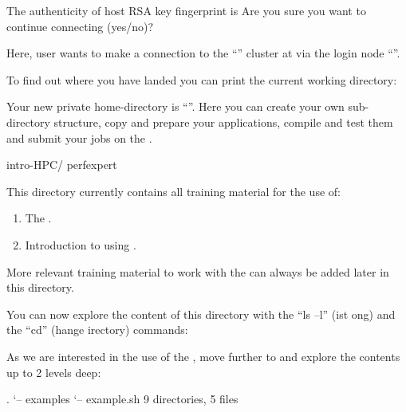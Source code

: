 \begin{prompt}
The authenticity of host %
RSA key fingerprint is %
Are you sure you want to continue connecting (yes/no)? %
\end{prompt}

Here, user \userid wants to make a connection to the ``\hpcname'' cluster at
\university via the login node ``\loginnode''.

\fi
{}
To find out where you have landed you can print the current working directory:
\begin{prompt}
\end{prompt}


Your new private home-directory is ``\homedir''.
Here you can create your own sub-directory structure, copy and prepare your
applications, compile and test them and submit your jobs on the \hpc.

\begin{prompt}
intro-HPC/
perfexpert
\end{prompt}

This directory currently contains all training material for the use of:

\begin{enumerate}
\item  The .
\item  Introduction to using .
\end{enumerate}

More relevant training material to work with the \hpc can always be added
later in this directory.

You can now explore the content of this directory with the ``ls --l''
(ist ong) and the ``cd'' (hange
irectory) commands:

As we are interested in the use of the , move further to
 and explore the contents up to 2 levels deep:

\begin{prompt}
.
`-- examples
    `-- example.sh
9 directories, 5 files
\end{prompt}

